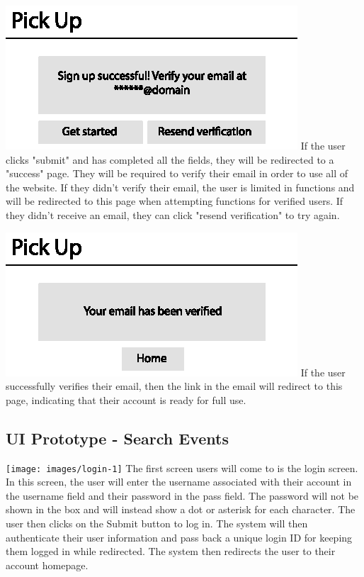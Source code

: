 \documentclass[a4paper]{article}
\begin{document}
\includegraphics[width=\textwidth]{images/signup2.eps}
If the user clicks "submit" and has completed all the fields, they will be redirected to a "success" page. They will be required to verify their email in order to use all of the website. If they didn't verify their email, the user is limited in functions and will be redirected to this page when attempting functions for verified users. If they didn't receive an email, they can click "resend verification" to try again.

\includegraphics[width=\textwidth]{images/signup3.eps}
If the user successfully verifies their email, then the link in the email will redirect to this page, indicating that their account is ready for full use.

\subsection{UI Prototype - Search Events}

\texttt{[image: images/login-1]}
The first screen users will come to is the login screen. In this screen, the user will enter the username associated with their account in the username field and their password in the pass field. The password will not be shown in the box and will instead show a dot or asterisk for each character. The user then clicks on the Submit button to log in. The system will then authenticate their user information and pass back a unique login ID for keeping them logged in while redirected. The system then redirects the user to their account homepage.
\end{document}
